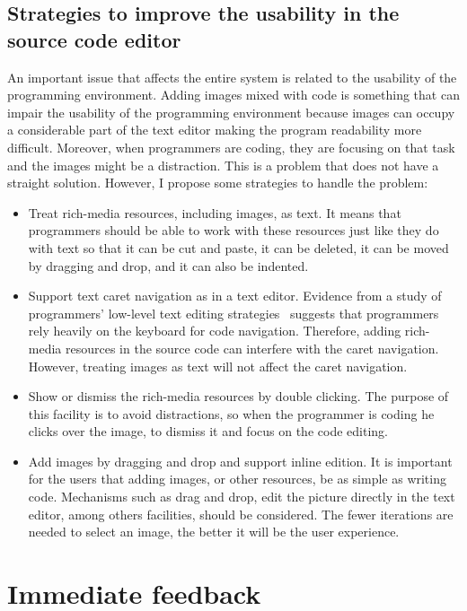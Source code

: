 \subsection{Strategies to improve the usability in the source code editor}

An important issue that affects the entire system is related to the usability of the programming environment. Adding images mixed with code is something that can impair the usability of the programming environment because images can occupy a considerable part of the text editor making the program readability more difficult. Moreover, when programmers are coding, they are focusing on that task and the images might be a distraction. This is a problem that does not have a straight solution. However, I propose some strategies to handle the problem:

\begin{itemize}
\item Treat rich-media resources, including images, as text. It means that programmers should be able to work with these resources just like they do with text so that it can be cut and paste, it can be deleted, it can be moved by dragging and drop, and it can also be indented.

\item Support text caret navigation as in a text editor. Evidence from a study of programmers' low-level text editing strategies~\citep{ko2005design} suggests that programmers rely heavily on the keyboard for code navigation. Therefore, adding rich-media resources in the source code can interfere with the caret navigation. However, treating images as text will not affect the caret navigation.

\item Show or dismiss the rich-media resources by double clicking. The purpose of this facility is to avoid distractions, so when the programmer is coding he clicks over the image, to dismiss it and focus on the code editing.

\item Add images by dragging and drop and support inline edition. It is important for the users that adding images, or other resources, be as simple as writing code. Mechanisms such as drag and drop, edit the picture directly in the text editor, among others facilities, should be considered. The fewer iterations are needed to select an image, the better it will be the user experience.
\end{itemize}

\section{Immediate feedback}

